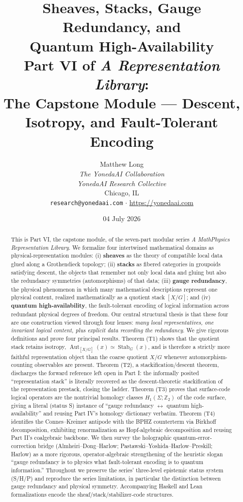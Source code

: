 \documentclass[12pt]{article}
\title{\textbf{Sheaves, Stacks, Gauge Redundancy, and\\
Quantum High-Availability}\\[0.4em]
\large Part VI of \emph{A \MtoP{} Representation Library}:\\
The Capstone Module --- Descent, Isotropy, and Fault-Tolerant Encoding}
\author{Matthew Long \\
\textit{The YonedaAI Collaboration} \\
\textit{YonedaAI Research Collective} \\
Chicago, IL \\
\texttt{research@yonedaai.com} $\cdot$ \url{https://yonedaai.com}}
\date{04 July 2026}
\theoremstyle{definition}
\theoremstyle{remark}
\newcommand{\Aut}{\operatorname{Aut}}
\newcommand{\Stab}{\operatorname{Stab}}
\newcommand{\quot}[2]{[#1/#2]}
\newcommand{\ZZ}{\mathbb{Z}}
\newcommand{\MtoP}{Math\textrightarrow{}Physics}
\newcommand{\Ss}{\textsf{S}}
\newcommand{\Hh}{\textsf{H}}
\newcommand{\Pp}{\textsf{P}}
\begin{document}
\maketitle

\begin{abstract}
This is Part VI, the capstone module, of the seven-part modular series
\emph{A \MtoP{} Representation Library}. We formalize four intertwined
mathematical domains as physical-representation modules: (i) \textbf{sheaves} as the
theory of compatible local data glued along a Grothendieck topology; (ii)
\textbf{stacks} as fibered categories in groupoids satisfying descent, the objects
that remember not only local data and gluing but also the redundancy symmetries
(automorphisms) of that data; (iii) \textbf{gauge redundancy}, the physical
phenomenon in which many mathematical descriptions represent one physical content,
realized mathematically as a quotient stack $\quot{X}{G}$; and (iv) \textbf{quantum
high-availability}, the fault-tolerant encoding of logical information across
redundant physical degrees of freedom. Our central structural thesis is that these
four are one construction viewed through four lenses: \emph{many local
representatives, one invariant logical content, plus explicit data recording the
redundancy}. We give rigorous definitions and prove four principal results. Theorem
(T1) shows that the quotient stack retains isotropy, $\Aut_{\quot{X}{G}}(x)\simeq
\Stab_G(x)$, and is therefore a strictly more faithful representation object than the
coarse quotient $X/G$ whenever automorphism-counting observables are present. Theorem
(T2), a stackification/descent theorem, discharges the forward reference left open in
Part I: the informally posited ``representation stack'' is literally recovered as the
descent-theoretic stackification of the representation prestack, closing the ladder.
Theorem (T3) proves that surface-code logical operators are the nontrivial homology
classes $H_1(\Sigma;\ZZ_2)$ of the code surface, giving a literal (status \Ss) instance
of ``gauge redundancy $\leftrightarrow$ quantum high-availability'' and reusing Part
IV's homology dictionary verbatim. Theorem (T4) identifies the Connes--Kreimer
antipode with the BPHZ counterterm via Birkhoff decomposition, exhibiting
renormalization as Hopf-algebraic decomposition and reusing Part II's coalgebraic
backbone. We then survey the holographic quantum-error-correction bridge
(Almheiri--Dong--Harlow; Pastawski--Yoshida--Harlow--Preskill; Harlow) as a more
rigorous, operator-algebraic strengthening of the heuristic slogan ``gauge redundancy
is to physics what fault-tolerant encoding is to quantum information.'' Throughout we
preserve the series' three-level epistemic status system (\Ss/\Hh/\Pp) and reproduce
the series limitations, in particular the distinction between gauge redundancy and
physical symmetry. Accompanying Haskell and Lean formalizations encode the
sheaf/stack/stabilizer-code structures.
\end{abstract}
\end{document}
